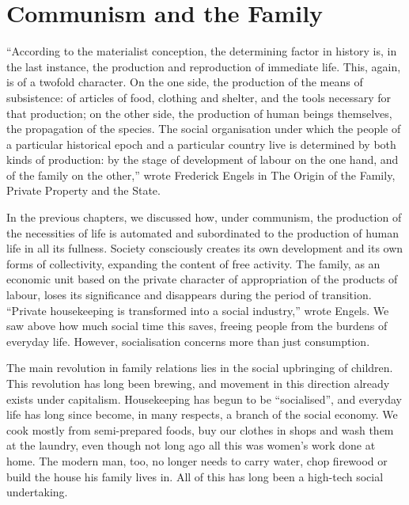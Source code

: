 \documentclass[../main]{subfiles}
\begin{document}
\ifSubfilesClassLoaded{\setcounter{page}{50}}{}
\section{Communism and the Family}
\label{sec:09_communism_family}

“According to the materialist conception, the determining factor in history is, in the last instance, the production and reproduction of immediate life. This, again, is of a twofold character. On the one side, the production of the means of subsistence: of articles of food, clothing and shelter, and the tools necessary for that production; on the other side, the production of human beings themselves, the propagation of the species. The social organisation under which the people of a particular historical epoch and a particular country live is determined by both kinds of production: by the stage of development of labour on the one hand, and of the family on the other,” wrote Frederick Engels in The Origin of the Family, Private Property and the State.

In the previous chapters, we discussed how, under communism, the production of the necessities of life is automated and subordinated to the production of human life in all its fullness. Society consciously creates its own development and its own forms of collectivity, expanding the content of free activity. The family, as an economic unit based on the private character of appropriation of the products of labour, loses its significance and disappears during the period of transition. “Private housekeeping is transformed into a social industry,” wrote Engels. We saw above how much social time this saves, freeing people from the burdens of everyday life. However, socialisation concerns more than just consumption.

The main revolution in family relations lies in the social upbringing of children. This revolution has long been brewing, and movement in this direction already exists under capitalism. Housekeeping has begun to be “socialised”, and everyday life has long since become, in many respects, a branch of the social economy. We cook mostly from semi-prepared foods, buy our clothes in shops and wash them at the laundry, even though not long ago all this was women’s work done at home. The modern man, too, no longer needs to carry water, chop firewood or build the house his family lives in. All of this has long been a high-tech social undertaking.
\end{document}
